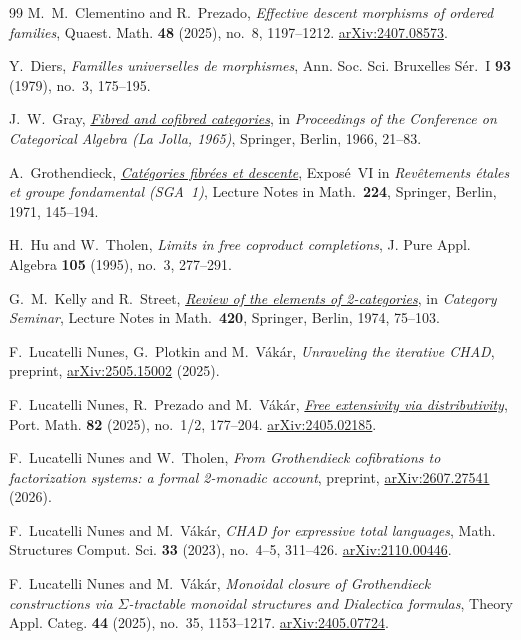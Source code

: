 \documentclass[11pt,a4paper]{amsart}
\theoremstyle{definition}
\numberwithin{equation}{section}
\begin{document}
\begin{thebibliography}{99}
 M.~M.~Clementino and R.~Prezado,
\emph{Effective descent morphisms of ordered families},
Quaest. Math. \textbf{48} (2025), no.~8, 1197--1212. \href{https://arxiv.org/abs/2407.08573}{arXiv:2407.08573}.

 Y.~Diers,
\emph{Familles universelles de morphismes},
Ann. Soc. Sci. Bruxelles S\'er.~I \textbf{93} (1979), no.~3, 175--195.

 J.~W.~Gray,
\href{https://doi.org/10.1007/978-3-642-99902-4_2}{\emph{Fibred and cofibred categories}},
in \emph{Proceedings of the Conference on Categorical Algebra (La Jolla, 1965)},
Springer, Berlin, 1966, 21--83.

 A.~Grothendieck,
\href{https://doi.org/10.1007/BFb0058662}{\emph{Cat\'egories fibr\'ees et descente}},
Expos\'e~VI in \emph{Rev\^etements \'etales et groupe fondamental (SGA~1)},
Lecture Notes in Math.~\textbf{224}, Springer, Berlin, 1971, 145--194.

 H.~Hu and W.~Tholen,
\emph{Limits in free coproduct completions},
J. Pure Appl. Algebra \textbf{105} (1995), no.~3, 277--291.

 G.~M.~Kelly and R.~Street,
\href{https://doi.org/10.1007/BFb0063101}{\emph{Review of the elements of 2-categories}},
in \emph{Category Seminar}, Lecture Notes in Math.~\textbf{420},
Springer, Berlin, 1974, 75--103.



 F.~Lucatelli Nunes, G.~Plotkin and M.~V\'ak\'ar,
\emph{Unraveling the iterative CHAD},
preprint, \href{https://arxiv.org/abs/2505.15002}{arXiv:2505.15002} (2025).

 F.~Lucatelli Nunes, R.~Prezado and M.~V\'ak\'ar,
\href{https://doi.org/10.4171/PM/2129}{\emph{Free extensivity via distributivity}},
Port. Math. \textbf{82} (2025), no.~1/2, 177--204. \href{https://arxiv.org/abs/2405.02185}{arXiv:2405.02185}.

 F.~Lucatelli Nunes and W.~Tholen,
\emph{From Grothendieck cofibrations to factorization systems: a formal 2-monadic account},
preprint, \href{https://arxiv.org/abs/2607.27541}{arXiv:2607.27541} (2026).

 F.~Lucatelli Nunes and M.~V\'ak\'ar,
\emph{CHAD for expressive total languages},
Math. Structures Comput. Sci. \textbf{33} (2023), no.~4--5, 311--426. \href{https://arxiv.org/abs/2110.00446}{arXiv:2110.00446}.

 F.~Lucatelli Nunes and M.~V\'ak\'ar,
\emph{Monoidal closure of Grothendieck constructions via $\Sigma$-tractable monoidal structures and Dialectica formulas},
Theory Appl. Categ. \textbf{44} (2025), no.~35, 1153--1217. \href{https://arxiv.org/abs/2405.07724}{arXiv:2405.07724}.


\end{thebibliography}
\end{document}
